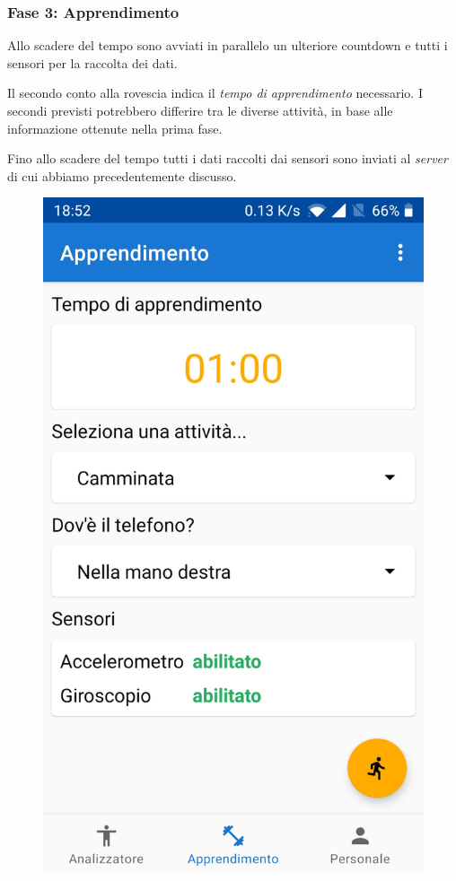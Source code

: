 \subsubsection{Fase 3: Apprendimento}
Allo scadere del tempo sono avviati in parallelo un ulteriore countdown e tutti i sensori per la raccolta dei dati.

Il secondo conto alla rovescia indica il \textit{tempo di apprendimento} necessario. I secondi previsti potrebbero differire tra le diverse attività, 
in base alle informazione ottenute nella prima fase. 

Fino allo scadere del tempo tutti i dati raccolti dai sensori sono inviati al \textit{server} di cui abbiamo precedentemente discusso.

\begin{figure}[H]
    \centering
    \includegraphics[scale = 0.1019]{assets/images/screenshots/2a_Init.jpg}

\end{figure}
